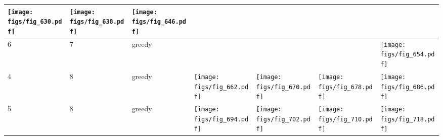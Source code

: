 \documentclass[oneside,canadian,landscape]{article}
\begin{document}
\begin{center}
\begin{longtable}{|l|l|l||l|l|l|l|}
\begin{minipage}{3.5cm}
\texttt{[image: figs/fig\_630.pdf]}
\end{minipage}
&\begin{minipage}{3.5cm}
\texttt{[image: figs/fig\_638.pdf]}
\end{minipage}
&\begin{minipage}{3.5cm}
\texttt{[image: figs/fig\_646.pdf]}
\end{minipage}
\\ \hline
6&7&greedy&&&&\begin{minipage}{3.5cm}
\texttt{[image: figs/fig\_654.pdf]}
\end{minipage}
\\ \hline
4&8&greedy&\begin{minipage}{3.5cm}
\texttt{[image: figs/fig\_662.pdf]}
\end{minipage}
&\begin{minipage}{3.5cm}
\texttt{[image: figs/fig\_670.pdf]}
\end{minipage}
&\begin{minipage}{3.5cm}
\texttt{[image: figs/fig\_678.pdf]}
\end{minipage}
&\begin{minipage}{3.5cm}
\texttt{[image: figs/fig\_686.pdf]}
\end{minipage}
\\ \hline
5&8&greedy&\begin{minipage}{3.5cm}
\texttt{[image: figs/fig\_694.pdf]}
\end{minipage}
&\begin{minipage}{3.5cm}
\texttt{[image: figs/fig\_702.pdf]}
\end{minipage}
&\begin{minipage}{3.5cm}
\texttt{[image: figs/fig\_710.pdf]}
\end{minipage}
&\begin{minipage}{3.5cm}
\texttt{[image: figs/fig\_718.pdf]}
\end{minipage}
\\ \hline
\end{longtable}
\end{center}
\end{document}
